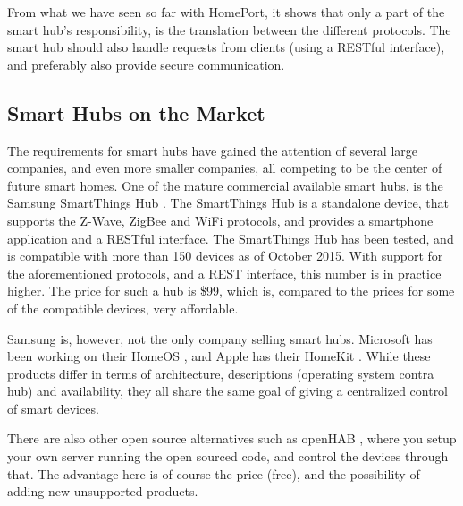 From what we have seen so far with HomePort, 
it shows that only a part of the smart hub's responsibility, 
is the translation between the different protocols. 
The smart hub should also handle requests from clients (\eg using a RESTful interface), 
and preferably also provide secure communication. 

\subsection{Smart Hubs on the Market}\label{sec:smarthubsmarket}
The requirements for smart hubs have gained the attention of several large companies, 
and even more smaller companies, 
all competing to be the center of future smart homes. 
One of the mature commercial available smart hubs, 
is the Samsung SmartThings Hub \cite{SMARTTHINGS}. 
The SmartThings Hub is a standalone device, 
that supports the Z-Wave, ZigBee and WiFi protocols, 
and provides a smartphone application and a RESTful interface. 
The SmartThings Hub has been tested, 
and is compatible with more than \num{150} devices as of October 2015.
With support for the aforementioned protocols, 
and a REST interface, this number is in practice higher.  
The price for such a hub is \$99, 
which is, compared to the prices for some of the compatible devices, very affordable. 

Samsung is, however, not the only company selling smart hubs. 
Microsoft has been working on their HomeOS \cite{HOMEOS}, 
and Apple has their HomeKit \cite{HOMEKIT}.
While these products differ in terms of architecture, descriptions (operating system contra hub) and availability,
they all share the same goal of giving a centralized control of smart devices. 

There are also other open source alternatives such as openHAB \cite{OPENHAB}, 
where you setup your own server running the open sourced code, 
and control the devices through that. 
The advantage here is of course the price (free), 
and the possibility of adding new unsupported products. 

